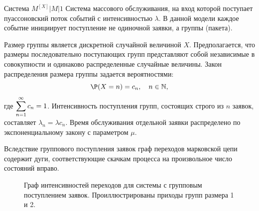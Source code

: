 \begin{definition}{Система $M^{[X]}|M|1$}
Система массового обслуживания, на вход которой поступает пуассоновский поток событий с интенсивностью $\lambda$. В данной модели каждое событие инициирует поступление не одиночной заявки, а группы (пакета). 

Размер группы является дискретной случайной величиной $X$. Предполагается, что размеры последовательно поступающих групп представляют собой независимые в совокупности и одинаково распределенные случайные величины. Закон распределения размера группы задается вероятностями:
$$ \P(X=n) = c_n, \quad n \in \N, $$
где $\displaystyle \sum_{n=1}^{\infty} c_n = 1$. Интенсивность поступления групп, состоящих строго из $n$ заявок, составляет $\lambda_n = \lambda c_n$. Время обслуживания отдельной заявки распределено по экспоненциальному закону с параметром $\mu$.
\end{definition}

Вследствие группового поступления заявок граф переходов марковской цепи содержит дуги, соответствующие скачкам процесса на произвольное число состояний вправо.

\begin{figure}[h!]
    \centering
    \caption{Граф интенсивностей переходов для системы с групповым поступлением заявок. Проиллюстрированы приходы групп размера 1 и 2.}
\end{figure}

